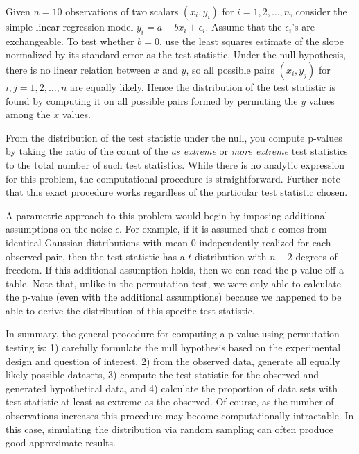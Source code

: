 \begin{example} Given $n=10$ observations of two scalars $(x_i, y_i)$ for
$i = 1, 2, \dots, n$, consider the simple linear regression model
$y_i = a + bx_i + \epsilon_i$.  Assume that the $\epsilon_i$'s are
exchangeable.  To test whether $b = 0$, use the least squares estimate of the slope
normalized by its standard error as the test statistic.  Under the null
hypothesis, there is no linear relation between $x$ and $y$, so all possible
pairs $(x_i,y_j)$ for $i, j = 1, 2, \dots, n$ are equally likely.  Hence the
distribution of the test statistic is found by computing it on all possible
pairs formed by permuting the $y$ values among the $x$ values.

From the distribution of the test statistic under the null, you compute
p-values by taking the ratio of the count of the \emph{as extreme} or
\emph{more extreme} test statistics to the total number of such test
statistics. While there is no analytic expression for this problem, the
computational procedure is straightforward.  Further note that this exact
procedure works regardless of the particular test statistic chosen.

A parametric approach to this problem would begin by imposing additional
assumptions on the noise $\epsilon$.  For example, if it is assumed that
$\epsilon$ comes from identical Gaussian distributions with mean 0
independently realized for each observed pair, then the test statistic has a
$t$-distribution with $n-2$ degrees of freedom.  If this additional assumption
holds, then we can read the p-value off a table.  Note that, unlike in the
permutation test, we were only able to calculate the p-value (even with the
additional assumptions) because we happened to be able to derive the
distribution of this specific test statistic.
\end{example}


In summary, the general procedure for computing a p-value using permutation
testing is: 1) carefully formulate the null hypothesis based on the
experimental design and question of interest, 2) from the observed data,
generate all equally likely possible datasets, 3) compute the test statistic
for the observed and generated hypothetical data, and 4) calculate the
proportion of data sets with test statistic at least as extreme as the
observed.  Of course, as the number of observations increases this procedure
may become computationally intractable.  In this case, simulating the
distribution via random sampling can often produce good approximate results.


